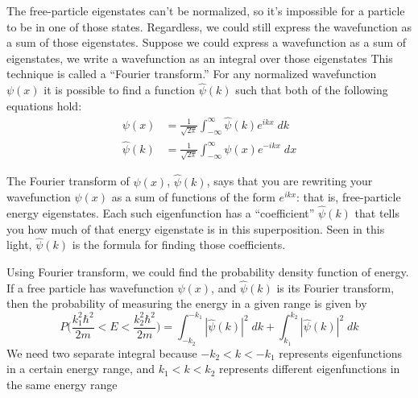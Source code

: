 \documentclass[../main.tex]{subfiles}
\begin{document}
The free-particle eigenstates can't be normalized, so it's impossible for a particle to be in one of those states. Regardless, we could still express the wavefunction as a sum of those eigenstates. Suppose we could express a wavefunction as a sum of eigenstates, we write a wavefunction as an integral over those eigenstates This technique is called a “Fourier transform.” For any normalized wavefunction ${\psi}(x)$ it is possible to find a function $\hat{\psi}(k)$ such that both of the following equations hold:
\begin{align*}
    \psi(x)&= \frac{1}{\sqrt{2\pi}} \int_{-\infty}^{\infty}\hat{\psi}(k) e^{ikx}\;dk\\
    \hat{\psi}(k)&= \frac{1}{\sqrt{2\pi}} \int_{-\infty}^{\infty}\psi(x) e^{-ikx}\;dx
\end{align*}

The Fourier transform of ${\psi}(x)$, $\hat{\psi}(k)$, says that you are rewriting your wavefunction ${\psi}(x)$ as a sum of functions of the form $e^{ikx}$: that is, free-particle energy eigenstates. Each such eigenfunction has a “coefficient” $\hat{\psi}(k)$ that tells you how much of that energy eigenstate is in this superposition. Seen in this light, $\hat{\psi}(k)$ is the formula for finding those coefficients.

Using Fourier transform, we could find the probability density function of energy. If a free particle has wavefunction ${\psi}(x)$, and $\hat{\psi}(k)$ is its Fourier transform, then the probability of measuring the energy in a given range is given by
\begin{equation*}
    P\biggl( \frac{k_1^2\hbar^2}{2m}<E< \frac{k_2^2\hbar^2}{2m}\biggr)=\int_{-k_2}^{-k_1}|\hat{\psi}(k)|^2\;dk+\int_{k_1}^{k_2}|\hat{\psi}(k)|^2\;dk
\end{equation*}
We need two separate integral because $-k_2 < k < - k_1$ represents eigenfunctions in a certain energy range, and $k_1 < k < k_2$ represents different eigenfunctions in the same energy range
\end{document}
